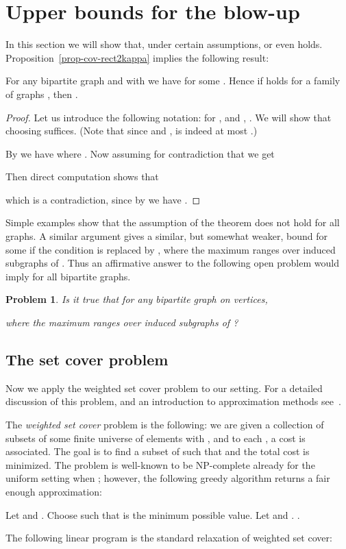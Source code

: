 \documentclass[submission]{llncs}
\newtheorem{openproblem}{Problem}
\begin{document}
\section{Upper bounds for the blow-up}
\label{sec-setcover}
In this section we will show that, under certain assumptions,  or even  holds.
Proposition~\ref{prop-cov-rect2kappa} implies the following result:
\begin{theorem} \label{thm:feltetel}
  For any bipartite graph  and  with  we have
 for some .
  Hence if  holds for a family of graphs , then
  .
\end{theorem}
  \begin{proof}
Let us introduce the following notation:  for ,  and , .
  We will show that 
  choosing  suffices. (Note that since  and ,  is indeed at most 
  .)


  By  we have  where .
  Now assuming for contradiction that  we get
  
Then direct computation shows that

  which is a contradiction, since by  we have .
\end{proof}
  Simple examples show that the assumption of the theorem does not hold for all graphs.
  A similar argument gives a similar, but somewhat weaker, bound  for some 
  if the condition  is replaced by ,
  where the maximum ranges over induced subgraphs  of .
  Thus an affirmative answer to the following open problem would imply  for all bipartite graphs.
  \begin{openproblem}
  Is it true that for any bipartite graph  on  vertices,
  
  where the maximum ranges over induced subgraphs  of ?
  \end{openproblem}
\subsection{The set cover problem}
  Now we apply the weighted set cover problem to our setting.
  For
a
  detailed discussion of this problem, and an introduction
  to approximation methods
see~\cite{Williamson:2011:DAA:1971947}.

  The \emph{weighted set cover} problem is the following: we are given a collection  of subsets of some finite
  universe  of  elements with , and to each , a cost  is associated.
The goal is to find a subset  of  such that  and the total cost  is minimized.
The problem is well-known to be NP-complete already for the uniform setting when ; however, the following greedy algorithm
  returns a fair enough approximation:
\begin{algorithmic}
  \State Let  and .
  \While{}
  \State Choose  such that  is the minimum possible value.
  \State Let  and .
  \EndWhile
  \Return .
  \end{algorithmic}
The following linear program is the standard relaxation of weighted set cover:
\end{document}
